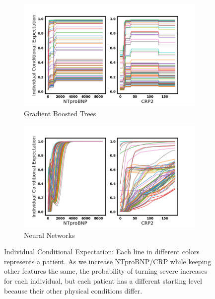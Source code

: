 \clearpage

\null
\vfill

\begin{figure}[H] \ContinuedFloat
\begin{subfigure}[b]{\textwidth}
    \centering
    \includegraphics[width=\textwidth]{figures/chapter_interp/xgbc_ice_crp_ntproBNP.png}
    \caption{Gradient Boosted Trees}
    \label{fig:gbt_ice}
\end{subfigure}
\hfill
\begin{subfigure}[b]{\textwidth}
    \centering
    \includegraphics[width=\textwidth]{figures/chapter_interp/nn_ice_crp_ntproBNP.png}
    \caption{Neural Networks}
    \label{fig:nn_ice}
\end{subfigure}
\caption{Individual Conditional Expectation: Each line in different colors represents a patient. As we increase NTproBNP/CRP while keeping other features the same, the probability of turning severe increases for each individual, but each patient has a different starting level because their other physical conditions differ.}
\label{fig.ice}
\end{figure}


